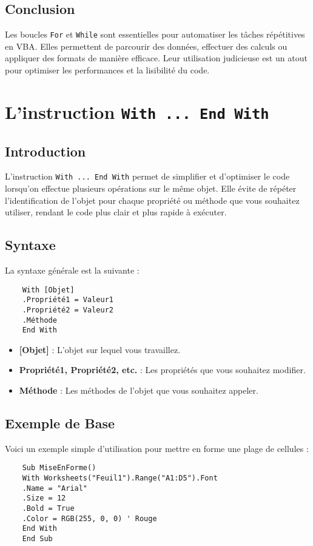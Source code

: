 \documentclass[a4paper,12pt]{report}
\begin{document}
\section{Conclusion}
Les boucles \texttt{For} et \texttt{While} sont essentielles pour automatiser les tâches répétitives en VBA. Elles permettent de parcourir des données, effectuer des calculs ou appliquer des formats de manière efficace. Leur utilisation judicieuse est un atout pour optimiser les performances et la lisibilité du code.



\chapter{L'instruction \texttt{With ... End With}}

\section{Introduction}
L'instruction \texttt{With ... End With} permet de simplifier et d'optimiser le code lorsqu'on effectue plusieurs opérations sur le même objet. Elle évite de répéter l'identification de l'objet pour chaque propriété ou méthode que vous souhaitez utiliser, rendant le code plus clair et plus rapide à exécuter.

\section{Syntaxe}
La syntaxe générale est la suivante :
\begin{lstlisting}
	With [Objet]
	.Propriété1 = Valeur1
	.Propriété2 = Valeur2
	.Méthode
	End With
\end{lstlisting}
\begin{itemize}
	\item \textbf{[Objet]} : L'objet sur lequel vous travaillez.
	\item \textbf{Propriété1, Propriété2, etc.} : Les propriétés que vous souhaitez modifier.
	\item \textbf{Méthode} : Les méthodes de l'objet que vous souhaitez appeler.
\end{itemize}
\newpage
\section{Exemple de Base}
Voici un exemple simple d'utilisation pour mettre en forme une plage de cellules :
\begin{lstlisting}
	Sub MiseEnForme()
	With Worksheets("Feuil1").Range("A1:D5").Font
	.Name = "Arial"
	.Size = 12
	.Bold = True
	.Color = RGB(255, 0, 0) ' Rouge
	End With
	End Sub
\end{lstlisting}
\end{document}
